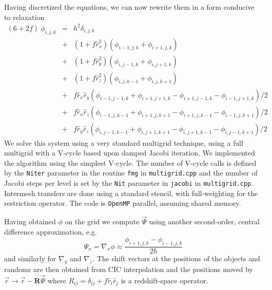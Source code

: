 \documentclass[a4paper,11pt]{article}
\begin{document}
Having discretized the equations, we can now rewrite them in a form
conducive to relaxation
\begin{eqnarray}
  (6+2f)\ \phi_{i,j,k} &=& h^2 \delta_{i,j,k} \nonumber \\
  &+&(1+f\hat{r}_x^2)\left( \phi_{i-1,j,k}+\phi_{i+1,j,k} \right) \nonumber \\
  &+&(1+f\hat{r}_y^2)\left( \phi_{i,j-1,k}+\phi_{i,j+1,k} \right) \nonumber \\
  &+&(1+f\hat{r}_z^2)\left( \phi_{i,j,k-1}+\phi_{i,j,k+1} \right) \nonumber \\
  &+&f\hat{r}_x\hat{r}_y\left( \phi_{i-1,j-1,k}+\phi_{i+1,j+1,k}
                              -\phi_{i+1,j-1,k}-\phi_{i-1,j+1,k} \right)/2
      \nonumber \\
  &+&f\hat{r}_x\hat{r}_z\left( \phi_{i-1,j,k-1}+\phi_{i+1,j,k+1}
                              -\phi_{i+1,j,k-1}-\phi_{i-1,j,k+1} \right)/2
      \nonumber \\
  &+&f\hat{r}_y\hat{r}_z\left( \phi_{i,j-1,k-1}+\phi_{i,j+1,k+1}
                              -\phi_{i,j+1,k-1}-\phi_{i,j-1,k+1} \right)/2
\end{eqnarray}
We solve this system using a very standard multigrid technique, using a full
multigrid with a V-cycle based upon damped Jacobi iteration.
We implemented the algorithm using the simplest V-cycle.
The number of V-cycle calls is defined by the {\tt Niter} parameter in
the routine {\tt fmg} in {\tt multigrid.cpp} and the number of Jacobi
steps per level is set by the {\tt Nit} parameter in {\tt jacobi} in
{\tt multigrid.cpp}.
Intermesh transfers are done using a standard stencil, with full-weighting
for the restriction operator.
The code is {\tt OpenMP} parallel, assuming shared memory.

Having obtained $\phi$ on the grid we compute $\vec{\Psi}$ using another
second-order, central difference approximation, e.g.
\begin{equation}
  \Psi_x = \nabla_x\phi \approx \frac{\phi_{i+1,j,k}-\phi_{i-1,j,k}}{2h}
\end{equation}
and similarly for $\nabla_y$ and $\nabla_z$.  The shift vectors at the
positions of the objects and randoms are then obtained from CIC interpolation
and the positions moved by $\vec{r}\to\vec{r}-\mathbf{R}\vec{\Psi}$ where
$R_{ij}=\delta_{ij}+f\hat{r}_i\hat{r}_j$ is a redshift-space operator.



\end{document}
